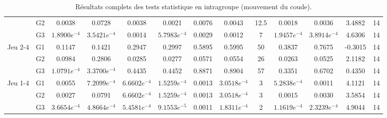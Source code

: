 {\begin{landscape}
\begin{table}[H]
\begin{tabular}{ll|cc|ccccc|cccc}
 & G2 & 0.0038 & 0.0728 & 0.0038 & 0.0021 & 0.0076 & 0.0043 & 12.5 & 0.0018 & 0.0036 & 3.4882 & 14 \\
 & G3 & $1.8900e^{-4}$ & $3.5421e^{-4}$ & 0.0014 & $5.7983e^{-4}$ & 0.0029 & 0.0012 & 7 & $1.9457e^{-4}$ & $3.8914e^{-4}$ & 4.6306 & 14 \\\hline
\multirow{3}{*}{Jeu 2-4} & G1 & 0.1147 & 0.1421 & 0.2947 & 0.2997 & 0.5895 & 0.5995 & 50 & 0.3837 & 0.7675 & -0.3015 & 14 \\
 & G2 & 0.0984 & 0.2806 & 0.0285 & 0.0277 & 0.0571 & 0.0554 & 26 & 0.0263 & 0.0525 & 2.1182 & 14 \\
 & G3 & $1.0791e^{-4}$ & $3.3700e^{-4}$ & 0.4435 & 0.4452 & 0.8871 & 0.8904 & 57 & 0.3351 & 0.6702 & 0.4350 & 14 \\\hline
\multirow{3}{*}{Jeu 1-4} & G1 & 0.0055 & $7.2099e^{-4}$ & $6.6602e^{-4}$ & $1.5259e^{-4}$ & 0.0013 & $3.0518e^{-4}$ & 3 & $5.2838e^{-4}$ & 0.0011 & 4.1121 & 14 \\
 & G2 & 0.0027 & 0.0791 & $6.6602e^{-4}$ & $1.5259e^{-4}$ & 0.0013 & $3.0518e^{-4}$ & 3 & 0.0015 & 0.0030 & 3.5854 & 14 \\
 & G3 & $3.6654e^{-4}$ & $4.8664e^{-4}$ & $5.4581e^{-4}$ & $9.1553e^{-5}$ & 0.0011 & $1.8311e^{-4}$ & 2 & $1.1619e^{-4}$ & $2.3239e^{-4}$ & 4.9044 & 14
\end{tabular}
\caption{Résultats complets des tests statistique en intragroupe (mouvement du coude).}
\end{table}
\end{landscape}}

